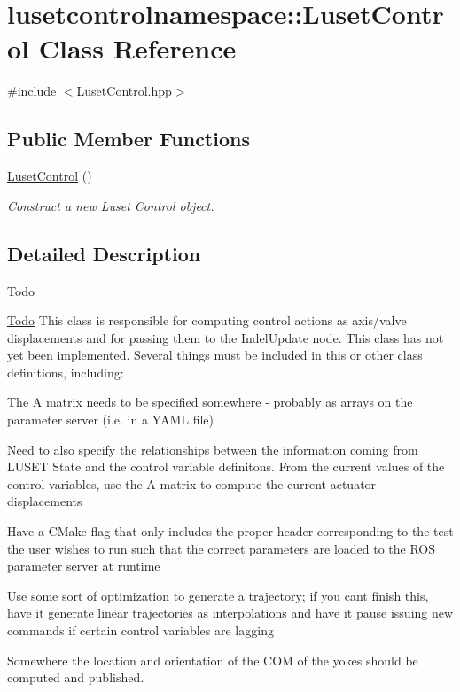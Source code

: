 \hypertarget{classlusetcontrolnamespace_1_1LusetControl}{}\section{lusetcontrolnamespace\+:\+:Luset\+Control Class Reference}
\label{classlusetcontrolnamespace_1_1LusetControl}


{\ttfamily \#include $<$Luset\+Control.\+hpp$>$}

\subsection*{Public Member Functions}
\begin{DoxyCompactItemize}
\item 
\hyperlink{classlusetcontrolnamespace_1_1LusetControl_ac7ff810736d5e163bbb0a6fb476d0009}{Luset\+Control} ()
\begin{DoxyCompactList}\small\item\em Construct a new Luset Control object. \end{DoxyCompactList}\end{DoxyCompactItemize}


\subsection{Detailed Description}
\begin{DoxyRefDesc}{Todo}
\item[\hyperlink{todo__todo000001}{Todo}]This class is responsible for computing control actions as axis/valve displacements and for passing them to the Indel\+Update node. This class has not yet been implemented. Several things must be included in this or other class definitions, including\+:
\begin{DoxyItemize}
\item The A matrix needs to be specified somewhere -\/ probably as arrays on the parameter server (i.\+e. in a Y\+A\+ML file)
\item Need to also specify the relationships between the information coming from L\+U\+S\+ET State and the control variable definitons. From the current values of the control variables, use the A-\/matrix to compute the current actuator displacements
\item Have a C\+Make flag that only includes the proper header corresponding to the test the user wishes to run such that the correct parameters are loaded to the R\+OS parameter server at runtime
\item Use some sort of optimization to generate a trajectory; if you can\textquotesingle{}t finish this, have it generate linear trajectories as interpolations and have it pause issuing new commands if certain control variables are lagging
\item Somewhere the location and orientation of the C\+OM of the yokes should be computed and published. 
\end{DoxyItemize}\end{DoxyRefDesc}


